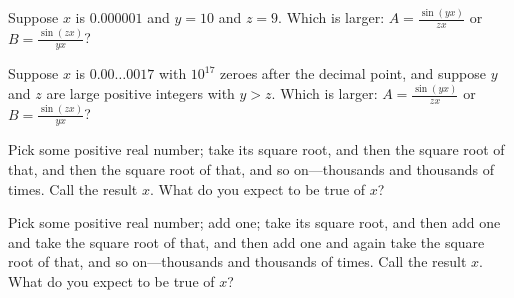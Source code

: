 \documentclass{ximera}
\begin{document}
\begin{problem}
  Suppose $x$ is $0.000001$ and $y = 10$ and $z = 9$.  Which is larger:
  $A = \frac{\sin (yx)}{zx}$ or $B = \frac{\sin (zx)}{yx}$?
  \begin{multipleChoice}
  \end{multipleChoice}
\end{problem}

\begin{problem}
  Suppose $x$ is $0.00\dots 0017$ with $10^{17}$ zeroes after the
  decimal point, and suppose $y$ and $z$ are large positive integers
  with $y > z$.  Which is larger: $A = \frac{\sin (yx)}{zx}$ or
  $B = \frac{\sin (zx)}{yx}$?
  \begin{multipleChoice}
  \end{multipleChoice}
\end{problem}

\begin{problem}
  Pick some positive real number; take its square root, and then the
  square root of that, and then the square root of that, and so
  on---thousands and thousands of times.  Call the result $x$.  What
  do you expect to be true of $x$?
  \begin{multipleChoice}
  \end{multipleChoice}
\end{problem}

\begin{problem}
  Pick some positive real number; add one; take its square root, and
  then add one and take the square root of that, and then add one and
  again take the square root of that, and so on---thousands and
  thousands of times.  Call the result $x$.  What do you expect to be
  true of $x$?
  \begin{multipleChoice}
  \end{multipleChoice}
\end{problem}
\end{document}
